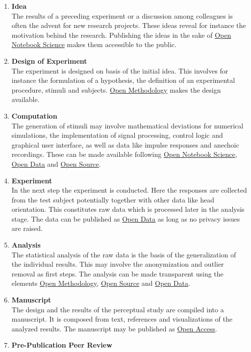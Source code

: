 \documentclass[a4paper, 10pt, twocolumn]{article}
\begin{document}
\begin{enumerate}
\item \textbf{Idea}\\
The results of a preceding experiment or a discussion among colleagues is often the advent 
for new research projects. These ideas reveal for instance the motivation behind the research. 
Publishing the ideas in the sake of \underline{Open Notebook Science} makes them accessible 
to the public.
%
\item \textbf{Design of Experiment}\\
The experiment is designed on basis of the initial idea. This involves for instance the formulation 
of a hypothesis, the definition of an experimental procedure, stimuli and subjects. \underline{Open Methodology} 
makes the design available.
%
\item\textbf{Computation}\\
The generation of stimuli may involve mathematical deviations for numerical simulations, the 
implementation of signal processing, control logic and graphical user interface, as well as data like impulse responses and anechoic recordings. These
can be made available following \underline{Open Notebook Science}, \underline{Open Data} and \underline{Open Source}.
%
\item \textbf{Experiment}\\
In the next step the experiment is conducted. Here the responses are collected from the test subject potentially 
together with other data like head orientation. This constitutes raw data which is processed later in the analysis stage. 
The data can be published as \underline{Open Data} as long as no privacy issues are raised.
%
\item \textbf{Analysis}\\
The statistical analysis of the raw data is the basis of the generalization of the individual results. This may
involve the anonymization and outlier removal as first steps. The analysis can be made transparent using the elements
\underline{Open Methodology}, \underline{Open Source} and \underline{Open Data}.
%
\item \textbf{Manuscript}\\
The design and the results of the perceptual study are compiled into a manuscript. It is composed
from text, references and visualizations of the analyzed results. The manuscript may be published 
as \underline{Open Access}.
%
\item \textbf{Pre-Publication Peer Review}\\

\end{enumerate}
\end{document}

